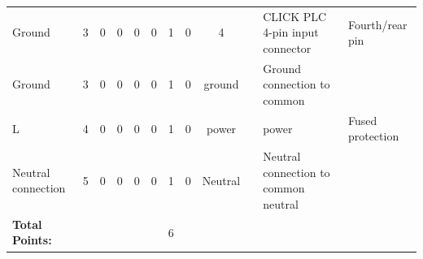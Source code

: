 \begin{table}[!htp]
{\begin{tabular}{lcccccccccll}
			Ground                          & 3                       & 0                                           & 0                                          & 0           & 0           & 1            & 0                & 4       &                              & CLICK PLC 4-pin input connector      & Fourth/rear pin  \\
			Ground                          & 3                       & 0                                           & 0                                          & 0           & 0           & 1            & 0                & ground  &                              & Ground connection to common          &                  \\
			L                               & 4                       & 0                                           & 0                                          & 0           & 0           & 1            & 0                & power   &                              & power                                & Fused protection \\
			Neutral connection              & 5                       & 0                                           & 0                                          & 0           & 0           & 1            & 0                & Neutral &                              & Neutral connection to common neutral &                  \\ \midrule
			\textbf{Total Points:}          &                         &                                             &                                            &             &             & 6            &                  &         &                              &                                      &                  \\ \bottomrule
		\end{tabular}
	}
\end{table}
